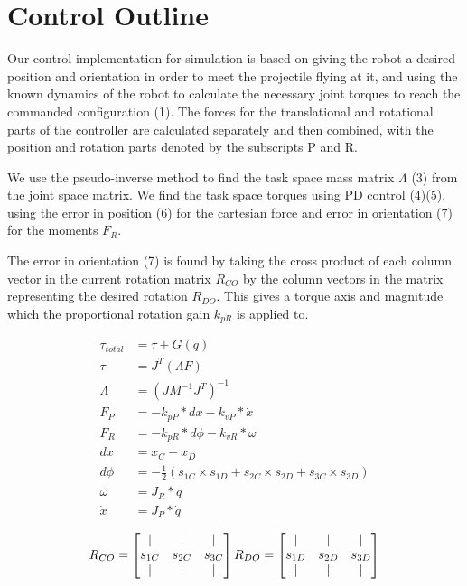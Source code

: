 \documentclass[10pt,a4paper,notitlepage]{report}
\begin{document}
\section*{Control Outline}

Our control implementation for simulation is based on giving the robot a desired position
and orientation in order to meet the projectile flying at it, and using the known dynamics of the robot to calculate the necessary joint torques to reach the commanded configuration (1). The forces for the translational and rotational parts of the controller
are calculated separately and then combined, with the position and rotation parts denoted
by the subscripts P and R. 

We use the pseudo-inverse method to 
find the task space mass matrix \(\Lambda\) (3)
from the joint space matrix. We find the task space torques using PD control (4)(5), 
using the error in position (6) for the cartesian force and error in orientation (7) 
for the moments \(F_{R}\). 

The error in orientation (7) is found by taking the cross product of each column vector in the 
current rotation matrix \(R_{CO}\) by the column vectors in the matrix 
representing the desired rotation \(R_{DO}\). This gives a torque axis and
 magnitude which the proportional rotation gain \(k_{pR}\) is applied to.

     

\begin{align}
\tau_{total} &= \tau +G(q)\\
\tau &= J^{T}(\Lambda F)\\
\Lambda &= (JM^{-1}J^{T})^{-1}\\F_{P} &= -k_{pP}*dx - k_{vP}*\dot{x}\\
F_{R} &= -k_{pR}*d\phi - k_{vR}*\omega\\
dx &= x_{C} - x_{D}\\
d\phi &= -\frac{1}{2}(s_{1C}\times s_{1D}+s_{2C}\times s_{2D}+s_{3C}\times s_{3D})\\
\omega &= J_{R}*\dot{q}\\
\dot{x} &= J_{P}*\dot{q}
\end{align}

\[R_{CO} = 
\begin{bmatrix}
\vert & \vert & \vert\\
s_{1C} & s_{2C} & s_{3C}\\
\vert & \vert & \vert\\
\end{bmatrix}\\
R_{DO} = 
\begin{bmatrix}
\vert & \vert & \vert\\
s_{1D} & s_{2D} & s_{3D}\\
\vert & \vert & \vert\\
\end{bmatrix}
\]
\end{document}

